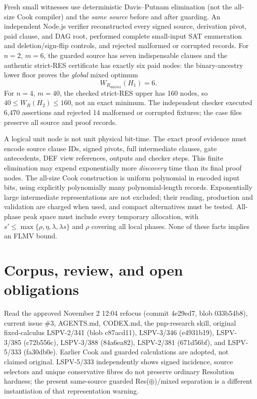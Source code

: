 \documentclass[11pt]{article}
\begin{document}
Fresh small witnesses use deterministic Davis--Putnam elimination (not the all-size Cook compiler) and the \emph{same source} before and after guarding. An independent Node.js verifier reconstructed every signed source, derivation pivot, paid clause, and DAG root, performed complete small-input SAT enumeration and deletion/sign-flip controls, and rejected malformed or corrupted records. For $n=2$, $m=6$, the guarded source has seven indispensable clauses and the authentic strict-RES certificate has exactly six paid nodes: the binary-ancestry lower floor proves the \emph{global} mixed optimum
\[
\boxed{W_{R_{\mathrm{mix341}}}(H_1)=6.}
\]
For $n=4$, $m=40$, the checked strict-RES upper has 160 nodes, so $40\le W_R(H_2)\le160$, not an exact minimum. The independent checker executed 6,470 assertions and rejected 14 malformed or corrupted fixtures; the case files preserve all source and proof records.

A logical unit node is not unit physical bit-time. The exact proof evidence must encode source clause IDs, signed pivots, full intermediate clauses, gate antecedents, DEF view references, outputs and checker steps. This finite elimination may expend exponentially more \emph{discovery} time than its final proof nodes. The all-size Cook construction is uniform polynomial in encoded input bits, using explicitly polynomially many polynomial-length records. Exponentially large intermediate representations are not excluded; their reading, production and validation are charged when used, and compact alternatives must be tested. All-phase peak space must include every temporary allocation, with $s'\le\max\{\rho,\eta,\lambda,\lambda s\}$ and $\rho$ covering all local phases. None of these facts implies an FLMV bound.

\section*{Corpus, review, and open obligations}
Read the approved November 2 12:04 refocus (commit 4e29ed7, blob 033b54b8), current issue \#3, AGENTS.md, CODEX.md, the pnp-research skill, original fixed-calculus LSPV-2/341 (blob c87acd11), LSPV-3/346 (e4931b19), LSPV-3/385 (c72b556c), LSPV-3/388 (84a6ea82), LSPV-2/381 (671d56bf), and LSPV-5/333 (fa30db0e). Earlier Cook and guarded calculations are adopted, not claimed original. LSPV-5/333 independently shows signed incidence, source selectors and unique conservative fibres do not preserve ordinary Resolution hardness; the present same-source guarded Res($\oplus$)/mixed separation is a different instantiation of that representation warning.
\end{document}
